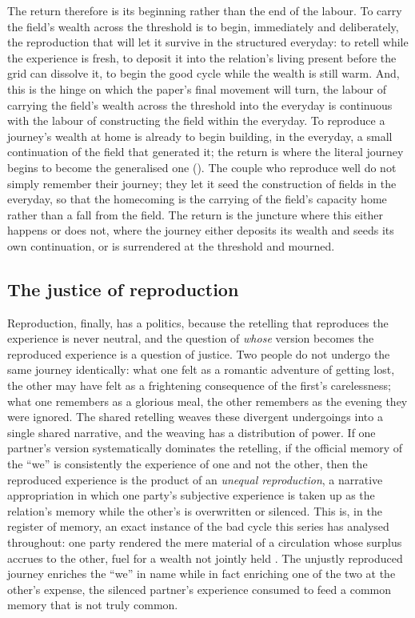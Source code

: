 The return therefore is its beginning rather than the end of the labour. To carry the field's wealth across the threshold is to begin, immediately and deliberately, the reproduction that will let it survive in the structured everyday: to retell while the experience is fresh, to deposit it into the relation's living present before the grid can dissolve it, to begin the good cycle while the wealth is still warm. And, this is the hinge on which the paper's final movement will turn, the labour of carrying the field's wealth across the threshold into the everyday is continuous with the labour of constructing the field within the everyday. To reproduce a journey's wealth at home is already to begin building, in the everyday, a small continuation of the field that generated it; the return is where the literal journey begins to become the generalised one (). The couple who reproduce well do not simply remember their journey; they let it seed the construction of fields in the everyday, so that the homecoming is the carrying of the field's capacity home rather than a fall from the field. The return is the juncture where this either happens or does not, where the journey either deposits its wealth and seeds its own continuation, or is surrendered at the threshold and mourned.

\subsection{The justice of reproduction}
\label{p21:sub:reproduction-justice}

Reproduction, finally, has a politics, because the retelling that reproduces the experience is never neutral, and the question of \emph{whose} version becomes the reproduced experience is a question of justice. Two people do not undergo the same journey identically: what one felt as a romantic adventure of getting lost, the other may have felt as a frightening consequence of the first's carelessness; what one remembers as a glorious meal, the other remembers as the evening they were ignored. The shared retelling weaves these divergent undergoings into a single shared narrative, and the weaving has a distribution of power. If one partner's version systematically dominates the retelling, if the official memory of the ``we'' is consistently the experience of one and not the other, then the reproduced experience is the product of an \emph{unequal reproduction}, a narrative appropriation in which one party's subjective experience is taken up as the relation's memory while the other's is overwritten or silenced. This is, in the register of memory, an exact instance of the bad cycle this series has analysed throughout: one party rendered the mere material of a circulation whose surplus accrues to the other, fuel for a wealth not jointly held \parencite{paperix,paperxvii}. The unjustly reproduced journey enriches the ``we'' in name while in fact enriching one of the two at the other's expense, the silenced partner's experience consumed to feed a common memory that is not truly common.

